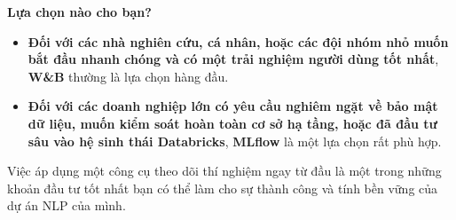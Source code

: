 \textbf{Lựa chọn nào cho bạn?}
\begin{itemize}
    \item \textbf{Đối với các nhà nghiên cứu, cá nhân, hoặc các đội nhóm nhỏ muốn bắt đầu nhanh chóng và có một trải nghiệm người dùng tốt nhất}, \textbf{W\&B} thường là lựa chọn hàng đầu.
    \item \textbf{Đối với các doanh nghiệp lớn có yêu cầu nghiêm ngặt về bảo mật dữ liệu, muốn kiểm soát hoàn toàn cơ sở hạ tầng, hoặc đã đầu tư sâu vào hệ sinh thái Databricks}, \textbf{MLflow} là một lựa chọn rất phù hợp.
\end{itemize}

Việc áp dụng một công cụ theo dõi thí nghiệm ngay từ đầu là một trong những khoản đầu tư tốt nhất bạn có thể làm cho sự thành công và tính bền vững của dự án NLP của mình.